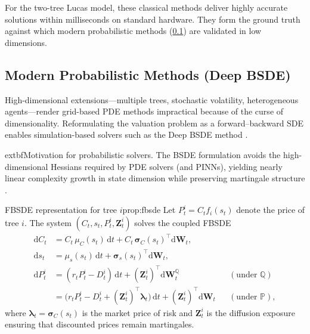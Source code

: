 ﻿\documentclass[11pt,letterpaper,oneside]{article}
\numberwithin{equation}{section}
\newcommand{\1}{\mathbf{1}}
\newcommand{\diff}{\mathrm{d}}
\begin{document}
\begin{tcolorbox}[didacticstyle, title={Computational benchmark}]
For the two-tree Lucas model, these classical methods deliver highly accurate solutions within milliseconds on standard hardware. They form the ground truth against which modern probabilistic methods (\cref{sec:computation_probabilistic}) are validated in low dimensions.
\end{tcolorbox}

\subsection{Modern Probabilistic Methods (Deep BSDE)}\label{sec:computation_probabilistic}
High-dimensional extensions---multiple trees, stochastic volatility, heterogeneous agents---render grid-based PDE methods impractical because of the curse of dimensionality. Reformulating the valuation problem as a forward--backward SDE enables simulation-based solvers such as the Deep BSDE method \cite{han2018solving,huang2025probabilistic}.
\begin{tcolorbox}[literaturestyle]
  extbf{Motivation for probabilistic solvers.} The BSDE formulation avoids the high-dimensional Hessians required by PDE solvers (and PINNs), yielding nearly linear complexity growth in state dimension while preserving martingale structure \cite{huang2025probabilistic}.
\end{tcolorbox}
\begin{proposition}{FBSDE representation for tree $i$}{prop:fbsde}
Let $P_t^i=C_t f_i(s_t)$ denote the price of tree $i$. The system $(C_t,s_t,P_t^i,\bm{Z}_t^i)$ solves the coupled FBSDE
\begin{align*}
  \diff C_t &= C_t\,\mu_C(s_t)\,\diff t + C_t\,\bm{\sigma}_C(s_t)^{\top}\diff\bm{W}_t,\\
  \diff s_t &= \mu_s(s_t)\,\diff t + \bm{\sigma}_s(s_t)^{\top}\diff\bm{W}_t,\\
  \diff P_t^i &= (r_t P_t^i - D_t^i)\,\diff t + (\bm{Z}_t^i)^{\top}\diff\bm{W}_t^{\mathbb{Q}} && (\text{under }\mathbb{Q})\\
              &= \big(r_t P_t^i - D_t^i + (\bm{Z}_t^i)^{\top}\bm{\lambda}_t\big)\,\diff t + (\bm{Z}_t^i)^{\top}\diff\bm{W}_t && (\text{under }\mathbb{P}),
\end{align*}
where $\bm{\lambda}_t=\bm{\sigma}_C(s_t)$ is the market price of risk and $\bm{Z}_t^i$ is the diffusion exposure ensuring that discounted prices remain martingales.
\end{proposition}
\end{document}
